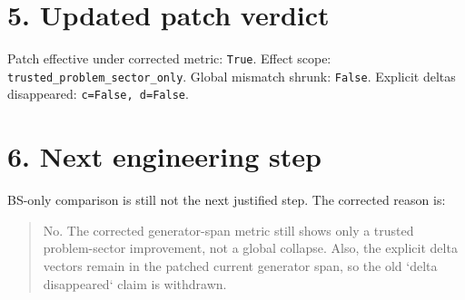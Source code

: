 \documentclass[11pt]{article}
\begin{document}
\section*{5. Updated patch verdict}
Patch effective under corrected metric: \texttt{True}. Effect scope: \texttt{trusted\_problem\_sector\_only}. Global mismatch shrunk: \texttt{False}. Explicit deltas disappeared: \texttt{c=False, d=False}.

\section*{6. Next engineering step}
BS-only comparison is still not the next justified step. The corrected reason is:
\begin{quote}
No. The corrected generator-span metric still shows only a trusted problem-sector improvement, not a global collapse. Also, the explicit delta vectors remain in the patched current generator span, so the old `delta disappeared` claim is withdrawn.
\end{quote}
\end{document}
